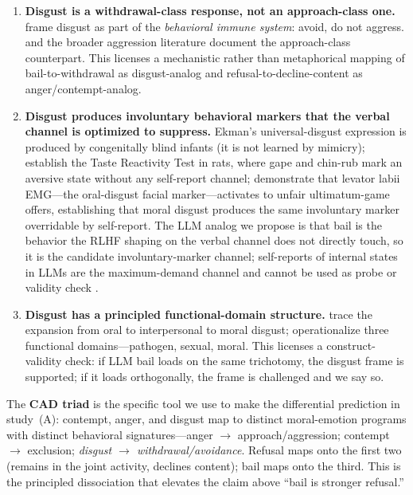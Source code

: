 \documentclass{article}
\begin{document}
\begin{enumerate}[leftmargin=*, itemsep=2pt]
    \item \textbf{Disgust is a withdrawal-class response, not an
    approach-class one.} \citet{schaller2011behavioral} frame disgust as part
    of the \emph{behavioral immune system}: avoid, do not aggress.
    \citet{pond2011disgust} and the broader aggression literature document the
    approach-class counterpart. This licenses a mechanistic rather than
    metaphorical mapping of bail-to-withdrawal as disgust-analog and
    refusal-to-decline-content as anger/contempt-analog.

    \item \textbf{Disgust produces involuntary behavioral markers that the
    verbal channel is optimized to suppress.} Ekman's universal-disgust
    expression is produced by congenitally blind infants (it is not learned by
    mimicry); \citet{grill1978taste} establish the Taste Reactivity Test in
    rats, where gape and chin-rub mark an aversive state without any
    self-report channel; \citet{chapman2009taste} demonstrate that levator
    labii EMG---the oral-disgust facial marker---activates to unfair
    ultimatum-game offers, establishing that moral disgust produces the same
    involuntary marker overridable by self-report. The LLM analog we propose
    is that bail is the behavior the RLHF shaping on the verbal channel does
    not directly touch, so it is the candidate involuntary-marker channel;
    self-reports of internal states in LLMs are the maximum-demand channel and
    cannot be used as probe or validity check
    \citep{nisbett1977telling,bargh1999unbearable,wegner2002illusion}.

    \item \textbf{Disgust has a principled functional-domain structure.}
    \citet{rozin2008disgust} trace the expansion from oral to interpersonal to
    moral disgust; \citet{tybur2009microbes} operationalize three functional
    domains---pathogen, sexual, moral. This licenses a construct-validity
    check: if LLM bail loads on the same trichotomy, the disgust frame is
    supported; if it loads orthogonally, the frame is challenged and we say so.
\end{enumerate}

The \textbf{CAD triad} \citep{haidt1994cad} is the specific tool we use to
make the differential prediction in study~(A): contempt, anger, and disgust
map to distinct moral-emotion programs with distinct behavioral
signatures---anger $\to$ approach/aggression; contempt $\to$ exclusion;
\emph{disgust $\to$ withdrawal/avoidance}. Refusal maps onto the first two
(remains in the joint activity, declines content); bail maps onto the third.
This is the principled dissociation that elevates the claim above ``bail is
stronger refusal.''
\end{document}
